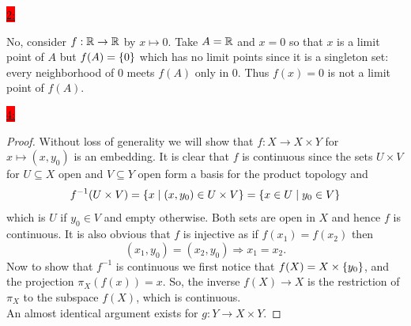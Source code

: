 \documentclass{exam}
\begin{document}
\colorbox{red}{\underline{2:}}
\begin{solution}
    No, consider $f: \mathbb R \to \mathbb R$ by $x \mapsto 0$. Take $A = \mathbb R$ and $x = 0$ so that $x$ is a limit point of $A$ but $f(A) = \left\{0 \right\}$ which has no limit points since it is a singleton set: every neighborhood of $0$ meets $f(A)$ only in $0$. Thus $f(x) = 0$ is not a limit point of $f(A)$.
\end{solution}

\colorbox{red}{\underline{4:}}
\begin{solution}
    \begin{proof}
        Without loss of generality we will show that $f: X \to X \times Y$ for $x \mapsto (x, y_0)$ is an embedding. It is clear that $f$ is continuous since the sets $U \times V$ for $U \subseteq X$ open and $V \subseteq Y$ open form a basis for the product topology and 
        \[
            f^{-1}(U \times V) = \left\{x \mid (x, y_0) \in U \times V \right\} = \left\{x \in U \mid y_0 \in V \right\}
        \]
        which is $U$ if $y_0 \in V$ and empty otherwise. Both sets are open in $X$ and hence $f$ is continuous. It is also obvious that $f$ is injective as if $f(x_1) = f(x_2)$ then
        \[
        (x_1, y_0) = (x_2, y_0) \Rightarrow x_1 = x_2.
        \]
        Now to show that $f^{-1}$ is continuous we first notice that $f(X) = X \times \left\{y_0 \right\}$, and the projection $\pi_X(f(x)) = x$. So, the inverse $f(X) \to X$ is the restriction of $\pi_X$ to the subspace $f(X)$, which is continuous. \\
        An almost identical argument exists for $g: Y \to X \times Y$.
    \end{proof}
\end{solution}
\end{document}
